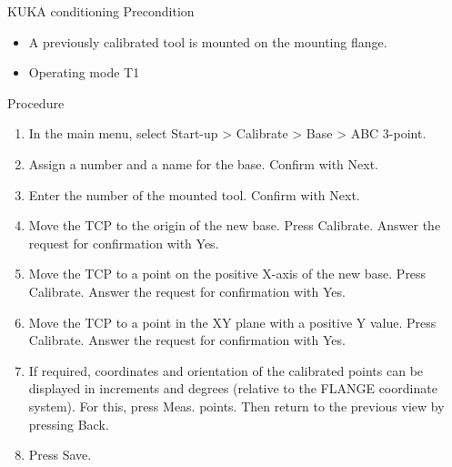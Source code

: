 \documentclass{book}
\begin{document}
\begin{chapter}{KUKA conditioning}
		Precondition
		\begin{itemize}
			\item A previously calibrated tool is mounted on the mounting flange.
			\item Operating mode T1
		\end{itemize}
		
		Procedure
		\begin{enumerate}
			\item In the main menu, select Start-up > Calibrate > Base > ABC 3-point.
			\item Assign a number and a name for the base. Confirm with Next.
			\item Enter the number of the mounted tool. Confirm with Next.
			\item Move the TCP to the origin of the new base. Press Calibrate. Answer the request for confirmation with Yes.
			\item Move the TCP to a point on the positive X-axis of the new base. Press Calibrate. Answer the request for confirmation with Yes.
			\item Move the TCP to a point in the XY plane with a positive Y value. Press Calibrate. Answer the request for confirmation with Yes.
			\item If required, coordinates and orientation of the calibrated points can be displayed in increments and degrees (relative to the FLANGE coordinate system). For this, press Meas. points. Then return to the previous view by pressing Back.
			\item Press Save.
		\end{enumerate}
		
		\newpage

\end{chapter}
\end{document}
